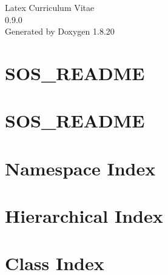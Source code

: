 \let\mypdfximage\pdfximage\def\pdfximage{\immediate\mypdfximage}\documentclass[twoside]{book}
\newcommand{\+}{\discretionary{\mbox{\scriptsize$\hookleftarrow$}}{}{}}
\newcommand{\clearemptydoublepage}{%
  \newpage{\pagestyle{empty}\cleardoublepage}%
}
\begin{document}
\hypersetup{pageanchor=false,
             bookmarksnumbered=true,
             pdfencoding=unicode
            }
\begin{titlepage}
\vspace*{7cm}
\begin{center}%
{\Large Latex Curriculum Vitae \\[1ex]\large 0.\+9.\+0 }\\
\vspace*{1cm}
{\large Generated by Doxygen 1.8.20}\\
\end{center}
\end{titlepage}
\clearemptydoublepage
{}
\tableofcontents
\clearemptydoublepage
{}
\hypersetup{pageanchor=true}

\chapter{S\+O\+S\+\_\+\+R\+E\+A\+D\+ME}
\label{md__c___users__sasch__one_drive_source_repos__visual__studio_latex_curriculum_vitae-dotnet_latex7a7074587e2e79bdb9bc880f1f6b1a30}

\chapter{S\+O\+S\+\_\+\+R\+E\+A\+D\+ME}
\label{md__c___users__sasch__one_drive_source_repos__visual__studio_latex_curriculum_vitae-dotnet_latexb2efd589e2d8afb522f2196dafdfa111}

\chapter{Namespace Index}

\chapter{Hierarchical Index}

\chapter{Class Index}

\end{document}
